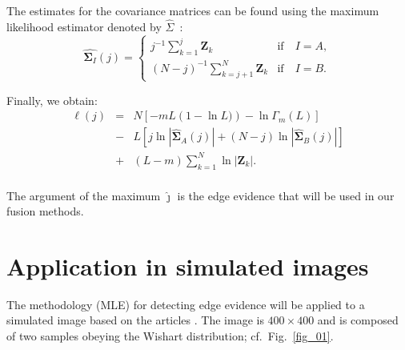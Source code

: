 \documentclass[conference]{IEEEtran}
\begin{document}
The estimates for the covariance matrices can be found using the maximum likelihood estimator denoted by $\widehat{\Sigma}$~\cite{good}: 
\begin{equation}\label{eq_13}
\widehat{\mathbf\Sigma_{I}}(j) = \left\{
\begin{array}{lc}
	j^{-1}\sum_{k=1}^{j}\mathbf{Z}_{k}  & \mbox{if}\quad I=A,  \\
        (N-j)^{-1}\sum_{k=j+1}^{N}\mathbf{Z}_{k} & \mbox{if}\quad I=B.
\end{array}
\right.
\end{equation}

Finally, we obtain:
\begin{equation}\label{eq_14}
\begin{array}{rcl}
	\ell(j)&=&N\left[-mL(1-\ln{L)})-\ln{\Gamma_m(L)}\right]\\
	&-&L\left[j\ln{|\mathbf{\widehat{\Sigma}}_{A}(j)|} +(N-j)\ln{|\mathbf{\widehat{\Sigma}}_{B}(j)|}\right]\\
	&+&(L-m)\sum_{k=1}^{N}\ln{|\mathbf{Z}_{k}|}. \\
\end{array}
\end{equation}

The argument of the maximum $\widehat{\jmath}$ is the edge evidence that will be used in our fusion methods.

\section{Application in simulated images}\label{cap_acf_sec4}

The methodology (MLE) for detecting edge evidence will be applied to a simulated image based on the articles \cite{nhfc,gamf}. 
The image is $400\times400$ and is composed of two samples obeying the Wishart distribution; cf.\ Fig.~\ref{fig_01}.
\end{document}
